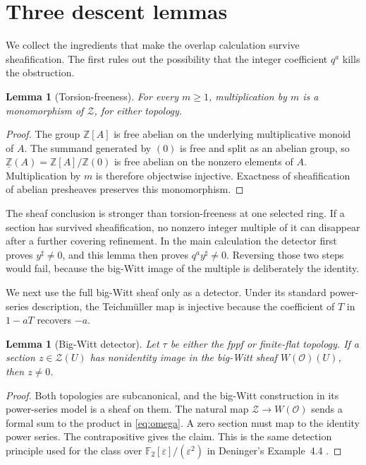 \documentclass[11pt]{article}
\newtheorem{lemma}[theorem]{Lemma}
\theoremstyle{definition}
\newcommand{\Wbig}{W}
\newcommand{\Zpre}{\underline{\mathbb Z}}
\newcommand{\Zsh}{\mathcal Z}
\newcommand{\sh}{\sharp}
\begin{document}
\section{Three descent lemmas}\label{sec:lemmas}

We collect the ingredients that make the overlap calculation survive
sheafification.  The first rules out the possibility that the integer
coefficient \(q^a\) kills the obstruction.

\begin{lemma}[Torsion-freeness]\label{lem:torsionfree}
For every \(m\geq1\), multiplication by \(m\) is a monomorphism of
\(\Zsh\), for either topology.
\end{lemma}

\begin{proof}
The group \(\mathbb Z[A]\) is free abelian on the underlying multiplicative
monoid of \(A\).  The summand generated by \((0)\) is free and split as an
abelian group, so \(\Zpre(A)=\mathbb Z[A]/\mathbb Z(0)\) is free abelian on
the nonzero elements of \(A\).  Multiplication by \(m\) is therefore
objectwise injective.  Exactness of sheafification of abelian presheaves
preserves this monomorphism.
\end{proof}

The sheaf conclusion is stronger than torsion-freeness at one selected
ring.  If a section has survived sheafification, no nonzero integer
multiple of it can disappear after a further covering refinement.  In the
main calculation the detector first proves \(y^\sh\ne0\), and this lemma
then proves \(q^a y^\sh\ne0\).  Reversing those two steps would fail,
because the big-Witt image of the multiple is deliberately the identity.

We next use the full big-Witt sheaf only as a detector.  Under its standard
power-series description, the Teichm\"uller map is injective because the
coefficient of \(T\) in \(1-aT\) recovers \(-a\).

\begin{lemma}[Big-Witt detector]\label{lem:detector}
Let \(\tau\) be either the fppf or finite-flat topology.  If a section
\(z\in\Zsh(U)\) has nonidentity image in the big-Witt sheaf
\(\Wbig(\mathcal O)(U)\), then \(z\ne0\).
\end{lemma}

\begin{proof}
Both topologies are subcanonical, and the big-Witt construction in its
power-series model is a sheaf on them.  The natural map
\(\Zsh\to\Wbig(\mathcal O)\) sends a formal sum to the product in
\eqref{eq:omega}.  A zero section must map to the identity power series.
The contrapositive gives the claim.  This is the same detection principle
used for the class over
\(\mathbb F_2[\varepsilon]/(\varepsilon^2)\) in Deninger's
Example~4.4 \cite[p.~22]{Deninger2025Rational}.
\end{proof}
\end{document}
